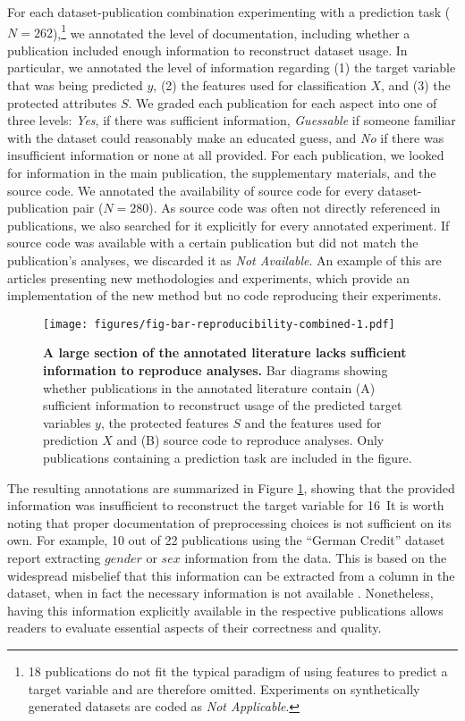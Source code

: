 For each dataset-publication combination experimenting with a prediction task ($N=262$),\footnote{18 publications do not fit the typical paradigm of using features to predict a target variable and are therefore omitted. Experiments on synthetically generated datasets are coded as \emph{Not Applicable}.} we annotated the level of documentation, including whether a publication included enough information to reconstruct dataset usage. In particular, we annotated the level of information regarding (1) the target variable that was being predicted $y$, (2) the features used for classification $X$, and (3) the protected attributes $S$. We graded each publication for each aspect into one of three levels: \textit{Yes}, if there was sufficient information, \textit{Guessable} if someone familiar with the dataset could reasonably make an educated guess, and \textit{No} if there was insufficient information or none at all provided. For each publication, we looked for information in the main publication, the supplementary materials, and the source code. We annotated the availability of source code for every dataset-publication pair ($N = 280$). As source code was often not directly referenced in publications, we also searched for it explicitly for every annotated experiment. If source code was available with a certain publication but did not match the publication's analyses, we discarded it as \emph{Not Available}. An example of this are articles presenting new methodologies and experiments, which provide an implementation of the new method but no code reproducing their experiments.

\begin{figure}    \centering
    \texttt{[image: figures/fig-bar-reproducibility-combined-1.pdf]} 
    \caption{\textbf{A large section of the annotated literature lacks sufficient information to reproduce analyses.} Bar diagrams showing whether publications in the annotated literature contain (A) sufficient information to reconstruct usage of the predicted target variables $y$, the protected features $S$ and the features used for prediction $X$ and (B) source code to reproduce analyses. Only publications containing a prediction task are included in the figure.}    \label{fig:info-quality}\end{figure} 

The resulting annotations are summarized in Figure \ref{fig:info-quality}, showing that the provided information was insufficient to reconstruct the target variable for 16\
It is worth noting that proper documentation of preprocessing choices is not sufficient on its own. For example, 10 out of 22 publications using the ``German Credit'' dataset report extracting $gender$ or $sex$ information from the data. This is based on the widespread misbelief that this information can be extracted from a column in the dataset, when in fact the necessary information is not available \citep{groemping2019south}. Nonetheless, having this information explicitly available in the respective publications allows readers to evaluate essential aspects of their correctness and quality. 

